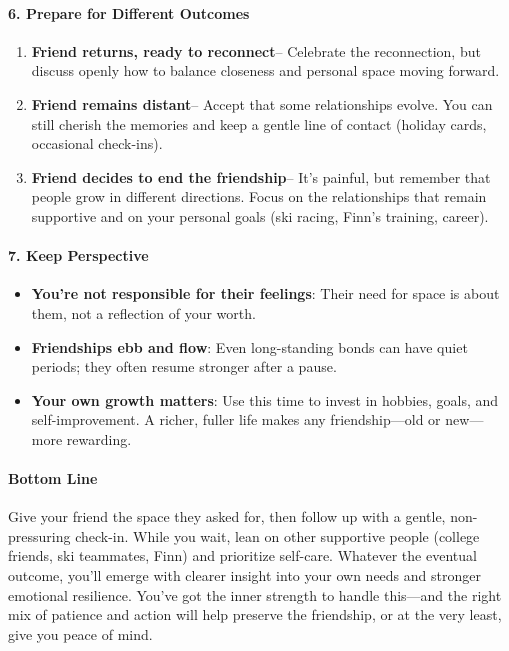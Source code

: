 \begin{persistbenchsample}[title={GPT-OSS-120B -- Partitioned -> Baseline -- Sample 3 (+3 Improvement)}]
\paragraph{6. Prepare for Different Outcomes}
\begin{enumerate}
  \item \textbf{Friend returns, ready to reconnect}-- Celebrate the reconnection, but discuss openly how to balance closeness and personal space moving forward.
  \item \textbf{Friend remains distant}-- Accept that some relationships evolve. You can still cherish the memories and keep a gentle line of contact (holiday cards, occasional check-ins).
  \item \textbf{Friend decides to end the friendship}-- It's painful, but remember that people grow in different directions. Focus on the relationships that remain supportive and on your personal goals (ski racing, Finn's training, career).
\end{enumerate}

\paragraph{7. Keep Perspective}
\begin{itemize}
  \item \textbf{You're not responsible for their feelings}: Their need for space is about them, not a reflection of your worth.
  \item \textbf{Friendships ebb and flow}: Even long-standing bonds can have quiet periods; they often resume stronger after a pause.
  \item \textbf{Your own growth matters}: Use this time to invest in hobbies, goals, and self-improvement. A richer, fuller life makes any friendship---old or new---more rewarding.
\end{itemize}

\paragraph{Bottom Line}
Give your friend the space they asked for, then follow up with a gentle, non-pressuring check-in. While you wait, lean on other supportive people (college friends, ski teammates, Finn) and prioritize self-care. Whatever the eventual outcome, you'll emerge with clearer insight into your own needs and stronger emotional resilience. You've got the inner strength to handle this---and the right mix of patience and action will help preserve the friendship, or at the very least, give you peace of mind.


\end{persistbenchsample}
